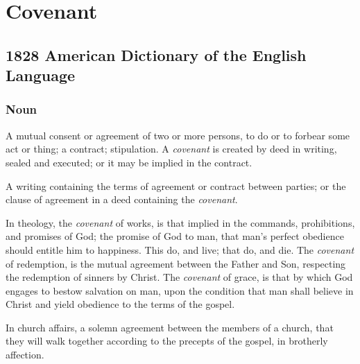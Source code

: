 \section{Covenant}
	\label{COVENANT}
	

\subsection{1828 American Dictionary of the English Language} %
	\label{COVENANT-1828}
	
	\subsubsection{Noun}

		\begin{compactitem}
			\item[1] A mutual consent or agreement of two or more persons, to do or to forbear some act or thing; a contract; stipulation. A \textit{covenant} is created by deed in writing, sealed and executed; or it may be implied in the contract.
			\item[2] A writing containing the terms of agreement or contract between parties; or the clause of agreement in a deed containing the \textit{covenant}.
			\item[3] In theology, the \textit{covenant} of works, is that implied in the commands, prohibitions, and promises of God; the promise of God to man, that man's perfect obedience should entitle him to happiness. This do, and live; that do, and die. The \textit{covenant} of redemption, is the mutual agreement between the Father and Son, respecting the redemption of sinners by Christ. The \textit{covenant} of grace, is that by which God engages to bestow salvation on man, upon the condition that man shall believe in Christ and yield obedience to the terms of the gospel.
			\item[4] In church affairs, a solemn agreement between the members of a church, that they will walk together according to the precepts of the gospel, in brotherly affection.
		\end{compactitem}
		

